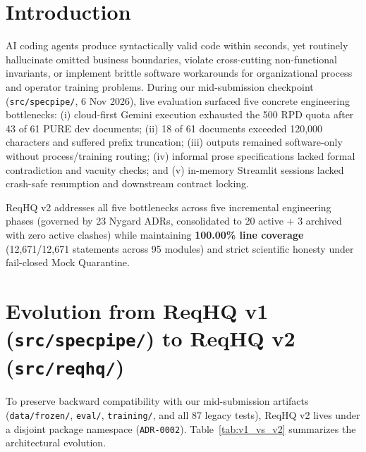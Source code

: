 \documentclass[11pt,a4paper]{article}
\begin{document}
\section{Introduction}
AI coding agents produce syntactically valid code within seconds, yet routinely hallucinate omitted business boundaries, violate cross-cutting non-functional invariants, or implement brittle software workarounds for organizational process and operator training problems. During our mid-submission checkpoint (\texttt{src/specpipe/}, 6 Nov 2026), live evaluation surfaced five concrete engineering bottlenecks: (i) cloud-first Gemini execution exhausted the 500 RPD quota after 43 of 61 PURE dev documents; (ii) 18 of 61 documents exceeded 120{,}000 characters and suffered prefix truncation; (iii) outputs remained software-only without process/training routing; (iv) informal prose specifications lacked formal contradiction and vacuity checks; and (v) in-memory Streamlit sessions lacked crash-safe resumption and downstream contract locking.

ReqHQ v2 addresses all five bottlenecks across five incremental engineering phases (governed by 23 Nygard ADRs, consolidated to 20 active + 3 archived with zero active clashes) while maintaining \textbf{100.00\% line coverage} (12{,}671/12{,}671 statements across 95 modules) and strict scientific honesty under fail-closed Mock Quarantine.

\section{Evolution from ReqHQ v1 (\texttt{src/specpipe/}) to ReqHQ v2 (\texttt{src/reqhq/})}
To preserve backward compatibility with our mid-submission artifacts (\texttt{data/frozen/}, \texttt{eval/}, \texttt{training/}, and all 87 legacy tests), ReqHQ v2 lives under a disjoint package namespace (\texttt{ADR-0002}). Table~\ref{tab:v1_vs_v2} summarizes the architectural evolution.
\end{document}
